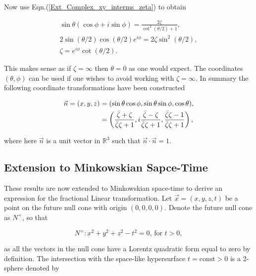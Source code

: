 \noindent Now use Eqn.(\ref{Ext_Complex_xy_interms_zeta}) to obtain

\begin{gather*}
\sin{\theta}(\cos{\phi} +i \sin{\phi}) = \frac{2\zeta}{\cot^2{\left(\theta/2\right)} + 1 }, \\
2\sin{\left(\theta/2\right)}\cos{\left(\theta/2\right)}e^{i\phi} = 2\zeta \sin^2{\left(\theta/2\right)}, \\
\zeta = e^{i\phi}\cot{\left(\theta/2\right)}. 
\end{gather*}

\noindent This makes sense as if $\zeta = \infty$ then $\theta = 0$ as one would expect. The coordinates $(\theta, \phi)$ can be used if one wishes to avoid working with $\zeta = \infty$. In summary the following coordinate transformations have been constructed

\begin{align}
\vec{n} = (x, y, z) & = (\sin{\theta}\cos{\phi}, \sin{\theta}\sin{\phi}, \cos{\theta}), \\ \label{Ext_Complex_Vec_n}
&
\begin{Huge}
                     = \left( \frac{\bar{\zeta} + \zeta}{\bar{\zeta}\zeta + 1}  ,i\frac{\bar{\zeta} - \zeta}{\bar{\zeta}\zeta + 1}, \frac{\bar{\zeta}\zeta - 1}{\bar{\zeta}\zeta + 1}  \right),
\end{Huge}
\end{align}

\noindent where here $\vec{n}$ is a unit vector in $\mathbb{R}^3$ such that $\vec{n} \cdot \vec{n} = 1$.

\subsection{Extension to Minkowskian Sapce-Time}\label{Fractional_Section_Extension_to_Minkowskian}

These results are now extended to Minkowskian space-time to derive an expression for the fractional Linear transformation. Let $\vec{x} = (x,y,z,t)$ be a point on the future null cone with origin $(0,0,0,0)$. Denote the future null cone as $N^{+}$, so that 

\begin{equation*}
N^+ : x^2 + y^2 + z^2 - t^2 = 0 \text{,  for  } t>0,
\end{equation*}

\noindent as all the vectors in the null cone have a Lorentz quadratic form equal to zero by definition. The intersection with the space-like hypersurface $t = \text{const}>0$ is a 2-sphere denoted by 

